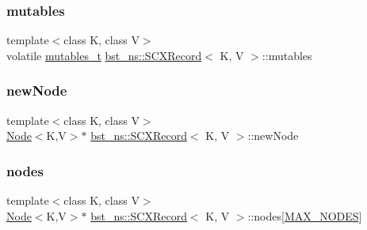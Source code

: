\mbox{\label{classbst__ns_1_1SCXRecord_ad707acfc8bceec490ba56fa95d4b5352}} 
\subsubsection{\texorpdfstring{mutables}{mutables}}
{\footnotesize\ttfamily template$<$class K, class V$>$ \\
volatile \hyperlink{descriptors_8h_a8a5af2749482b19d7515054489efca22}{mutables\+\_\+t} \hyperlink{classbst__ns_1_1SCXRecord}{bst\+\_\+ns\+::\+S\+C\+X\+Record}$<$ K, V $>$\+::mutables}

\mbox{\label{classbst__ns_1_1SCXRecord_adb045921444e7bc3c1dc3c3581752289}} 
\subsubsection{\texorpdfstring{new\+Node}{newNode}}
{\footnotesize\ttfamily template$<$class K, class V$>$ \\
\hyperlink{classbst__ns_1_1Node}{Node}$<$K,V$>$$\ast$ \hyperlink{classbst__ns_1_1SCXRecord}{bst\+\_\+ns\+::\+S\+C\+X\+Record}$<$ K, V $>$\+::new\+Node}

\mbox{\label{classbst__ns_1_1SCXRecord_a91ee309565cb07b7eca41b7aa9a26d39}} 
\subsubsection{\texorpdfstring{nodes}{nodes}}
{\footnotesize\ttfamily template$<$class K, class V$>$ \\
\hyperlink{classbst__ns_1_1Node}{Node}$<$K,V$>$$\ast$ \hyperlink{classbst__ns_1_1SCXRecord}{bst\+\_\+ns\+::\+S\+C\+X\+Record}$<$ K, V $>$\+::nodes\mbox{[}\hyperlink{scxrecord_8h_abd2aacdca9cb2a1a30f3392256b96ea3}{M\+A\+X\+\_\+\+N\+O\+D\+ES}\mbox{]}}


